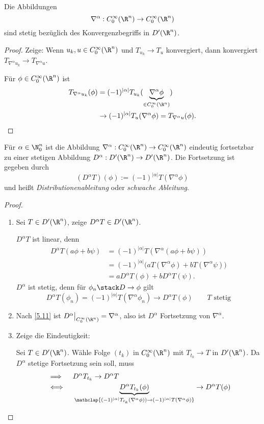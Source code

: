 \begin{st} \label{5.12}
	Die Abbildungen
	\[
		\nabla^\alpha : C_0^\infty(\R^n) \to C_0^\infty(\R^n)
	\]
	sind stetig bezüglich des Konvergenzbegriffs in $D'(\R^n)$.
	\begin{proof}
		Zeige: Wenn $u_k, u \in C_0^\infty(\R^n)$ und $T_{u_k} \to T_u$ konvergiert, dann konvergiert $T_{\nabla^\alpha u_k} \to T_{\nabla^\alpha u}$.

		Für $\phi \in C_0^\infty(\R^n)$ ist
		\begin{align*}
			T_{\nabla^\alpha u_k} (\phi) 
			&= (-1)^{|\alpha|} T_{u_k} (\underbrace{\nabla^\alpha \phi}_{\in C_0^\infty(\R^n)}) \\
			&\to (-1)^{|\alpha|} T_u(\nabla^\alpha \phi)
			= T_{\nabla^\alpha u}(\phi).
		\end{align*}
	\end{proof}
\end{st}

\begin{st} \label{5.13}
	Für $\alpha \in \N_0^n$ ist die Abbildung $\nabla^\alpha: C_0^\infty(\R^n) \to C_0^\infty(\R^n)$ eindeutig fortsetzbar zu einer stetigen Abbildung $D^\alpha: D'(\R^n) \to D'(\R^n)$.
	Die Fortsetzung ist gegeben durch
	\[
		(D^\alpha T)(\phi) := (-1)^{|\alpha|} T(\nabla^\alpha \phi)
	\]
	und heißt \emph{Distributionenableitung} oder \emph{schwache Ableitung}.
	\begin{proof}
		\begin{enumerate}[1)]
			\item
				Sei $T \in D'(\R^n)$, zeige $D^\alpha T \in D'(\R^n)$.

				$D^\alpha T$ ist linear, denn
				\begin{align*}
					D^\alpha T(a \phi + b \psi)
					&= (-1)^{|\alpha|} T(\nabla^{\alpha}(a \phi + b\psi)) \\
					&= (-1)^{|\alpha|} \big( aT(\nabla^\alpha \phi) + bT(\nabla^\alpha \psi) \big) \\
					&= a D^\alpha T(\phi) + b D^\alpha T(\psi).
				\end{align*}
				$D^\alpha$ ist stetig, denn für $\phi_n \stack D\to \phi$ gilt
				\[
					D^\alpha T(\phi_n)
					= (-1)^{|\alpha|} T(\nabla^\alpha \phi_n)
					\to D^\alpha T(\phi) \qquad \text{$T$ stetig}
				\]
			\item
				Nach \ref{5.11} ist $D^\alpha \big|_{C_0^\infty(\R^n)} = \nabla^\alpha$, also ist $D^\alpha$ Fortsetzung von $\nabla^\alpha$.
			\item
				Zeige die Eindeutigkeit:

				Sei $T \in D'(\R^n)$.
				Wähle Folge $(t_k)$ in $C_0^\infty(\R^n)$ mit $T_{t_k} \to T$ in $D'(\R^n)$.
				Da $D^\alpha$ stetige Fortsetzung sein soll, muss
				\begin{align*}
					&\implies \quad D^\alpha T_{t_k} \to D^\alpha T \\
					&\iff \quad \underbrace{D^\alpha T_{t_k}(\phi)}_{\mathclap{(-1)^{|\alpha|}T_{t_k}(\nabla^\alpha \phi)) \to (-1)^{|\alpha|}T(\nabla^\alpha \phi)}} \to D^\alpha T(\phi)
				\end{align*}
		\end{enumerate}
	\end{proof}
\end{st}

